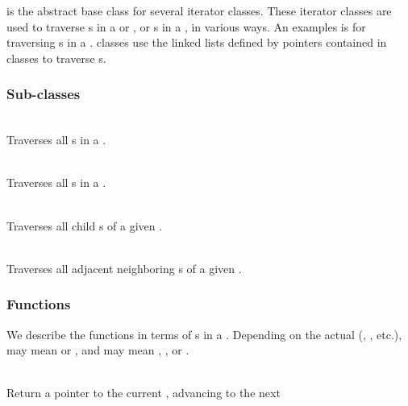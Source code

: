 \documentclass[11pt]{article}
\begin{document}
    is the abstract base class for several iterator
   classes.  These iterator classes are used to traverse s
   in a  or , or s in a
   , in various ways.  An examples is 
   for traversing s in a .  
   classes use the linked lists defined by pointers contained in
    classes to traverse s.

   \umlIterator

\subsubsection{ Sub-classes}

     \\
     Traverses all s in a .

     \\
     Traverses all s in a .

     \\
     Traverses all child s of a given .

     \\
     Traverses all adjacent neighboring s of a given .

\subsubsection{ Functions}

    We describe the  functions in terms of
    s in a .  Depending on the actual
     (, , etc.),
     may mean  or , and
     may mean , , or
    .
    
     \\
    Return a pointer to the current , advancing to the next 
\end{document}
